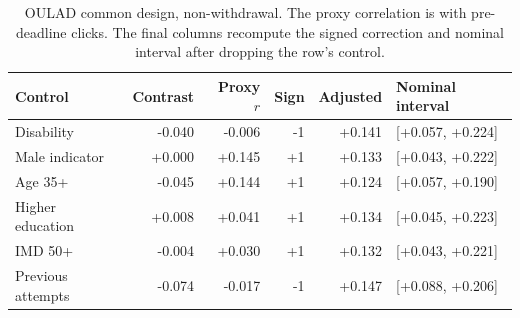 \begin{table}[htbp]\centering\small
\caption{OULAD common design, non-withdrawal. The proxy correlation is with pre-deadline clicks. The final columns recompute the signed correction and nominal interval after dropping the row's control.}\label{tab:target-loo}
\begin{tabularx}{\textwidth}{Xrrrrl}\toprule
Control & Contrast & Proxy $r$ & Sign & Adjusted & Nominal interval\\\midrule
Disability & -0.040 & -0.006 & -1 & +0.141 & [+0.057, +0.224] \\
Male indicator & +0.000 & +0.145 & +1 & +0.133 & [+0.043, +0.222] \\
Age 35+ & -0.045 & +0.144 & +1 & +0.124 & [+0.057, +0.190] \\
Higher education & +0.008 & +0.041 & +1 & +0.134 & [+0.045, +0.223] \\
IMD 50+ & -0.004 & +0.030 & +1 & +0.132 & [+0.043, +0.221] \\
Previous attempts & -0.074 & -0.017 & -1 & +0.147 & [+0.088, +0.206] \\
\bottomrule\end{tabularx}\end{table}
